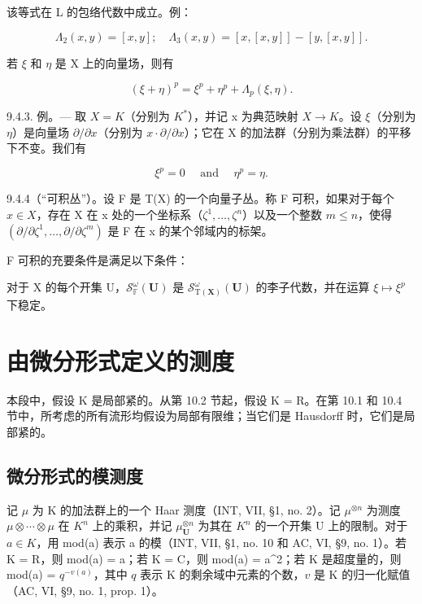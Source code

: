 该等式在 L 的包络代数中成立。例：

\[
\Lambda_ {2} (x, y) = [ x, y ]; \quad \Lambda_ {3} (x, y) = [ x, [ x, y ] ] - [ y, [ x, y ] ].
\]

若 \(\xi\) 和 \(\eta\) 是 X 上的向量场，则有

\[
(\xi + \eta) ^ {p} = \xi^ {p} + \eta^ {p} + \Lambda_ {p} (\xi , \eta).\tag{5}
\]

9.4.3. 例。--- 取 \(X = K\)（分别为 \(K^*\)），并记 x 为典范映射 \(X \to K\)。设 \(\xi\)（分别为 \(\eta\)）是向量场 \(\partial/\partial x\)（分别为 \(x\cdot\partial/\partial x\)）；它在 X 的加法群（分别为乘法群）的平移下不变。我们有

\[
\xi^ {p} = 0 \quad \text { and } \quad \eta^ {p} = \eta .\tag{6}
\]

9.4.4（“可积丛”）。设 F 是 T(X) 的一个向量子丛。称 F 可积，如果对于每个 \(x \in X\)，存在 X 在 x 处的一个坐标系（\(\zeta^{1}, \ldots, \zeta^{n}\)）以及一个整数 \(m \leqslant n\)，使得 \((\partial/\partial\zeta^{1}, \ldots, \partial/\partial\zeta^{m})\) 是 F 在 x 的某个邻域内的标架。

F 可积的充要条件是满足以下条件：

对于 X 的每个开集 U，\(\mathcal{S}_{\mathbb{F}}^{\omega}(\mathbf{U})\) 是 \(\mathcal{S}_{\mathrm{T}(\mathbf{X})}^{\omega}(\mathbf{U})\) 的李子代数，并在运算 \(\xi \mapsto \xi^{p}\) 下稳定。

\section{由微分形式定义的测度}

本段中，假设 K 是局部紧的。从第 10.2 节起，假设 K = R。在第 10.1 和 10.4 节中，所考虑的所有流形均假设为局部有限维；当它们是 Hausdorff 时，它们是局部紧的。

\subsection{微分形式的模测度}

记 \(\mu\) 为 K 的加法群上的一个 Haar 测度（INT, VII, §1, no. 2）。记 \(\mu^{\otimes n}\) 为测度 \(\mu \otimes \cdots \otimes \mu\) 在 \(K^n\) 上的乘积，并记 \(\mu_{\mathbf{U}}^{\otimes n}\) 为其在 \(K^n\) 的一个开集 U 上的限制。对于 \(a \in K\)，用 mod(a) 表示 a 的模（INT, VII, §1, no. 10 和 AC, VI, §9, no. 1）。若 K = R，则 mod(a) = \textbar a\textbar；若 K = C，则 mod(a) = \textbar a\textbar\^{}2；若 K 是超度量的，则 mod(a) = \(q^{-v(a)}\)，其中 \(q\) 表示 K 的剩余域中元素的个数，\(v\) 是 K 的归一化赋值（AC, VI, §9, no. 1, prop. 1）。

